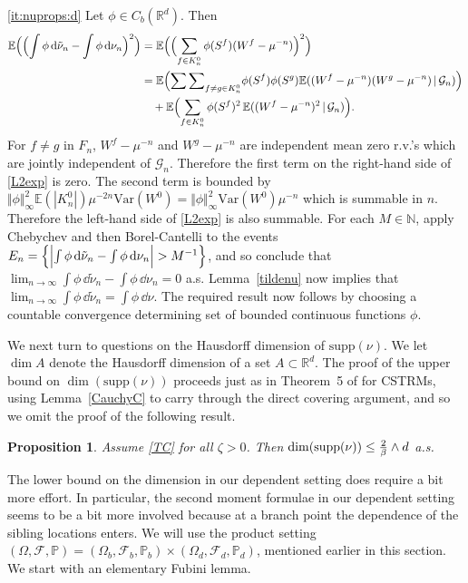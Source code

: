 \documentclass[12pt]{article}
\makeatletter
\renewenvironment{proof}[1][\proofname]{%
\par\pushQED{\qed}\normalfont%
\topsep6\p@\@plus6\p@\relax
\trivlist\item[\hskip\labelsep\bfseries#1\@addpunct{.}]%
\ignorespaces
}{%
\popQED\endtrivlist\@endpefalse
}
\newtheorem{proposition}[theorem]{Proposition}
\numberwithin{theorem}{section}
\theoremstyle{def}
\numberwithin{equation}{section}
\renewcommand{\P}{\mathbb{P}}
\newcommand{\E}{\mathbb{E}}
\newcommand{\R}{\mathbb{R}}
\newcommand{\N}{\mathbb{N}}
\newcommand{\cF}{\mathcal F}
\newcommand{\cG}{\mathcal G}
\newcommand{\supp}{\mathrm{supp}}
\makeatother
\begin{document}
\begin{proof}
\ref{it:nuprops:d} Let $\phi\in C_b(\R^d)$. Then
\begin{align}
\nonumber\E\Bigl(\Bigl( \int\phi\,\dd \tilde \nu_n-\int\phi\,\dd \nu_n\Bigr)^2\Bigr)&=\E\Bigl(\Bigl(\sum_{f\in K_n^0}\phi(S^f)(W^f-\mu^{-n})\Bigr)^2\Bigr)\\
\nonumber&=\E\Bigl({\sum\sum}_{f\neq g\in K^0_n} \phi(S^f)\phi(S^g)\E((W^f-\mu^{-n})(W^g-\mu^{-n}) \,| \,\cG_n)\Bigr)\\
\label{L2exp}&\quad+\E\Bigl(\sum_{f\in K^0_n}\phi(S^f)^2\,\E((W^f-\mu^{-n})^2 \, | \, \cG_n)\Bigr).
\end{align}
For $f\neq g$ in $F_n$, $W^f-\mu^{-n}$ and $W^g-\mu^{-n}$ are independent mean zero r.v.'s which are jointly independent of $\cG_n$. 
Therefore the first term on the right-hand side of \eqref{L2exp} is zero.  
The second term is bounded by $\Vert\phi\Vert_\infty^2\E(|K^0_n|)\mu^{-2n}\text{Var}(W^0)= \Vert\phi\Vert_\infty^2\text{Var}(W^0)\mu^{-n}$ which is summable in $n$.  
Therefore the left-hand side of \eqref{L2exp} is also summable. 
For each $M\in \N$, apply  Chebychev and then Borel-Cantelli to the events $E_n=\Bigl\{\Bigl| \int\phi\,\dd \tilde \nu_n-\int\phi\,\dd \nu_n\Bigr|>M^{-1}\Bigr\}$, and so conclude that $\lim_{n\to\infty}\int\phi\,\dd \tilde \nu_n-\int\phi\,\dd \nu_n=0$ a.s. Lemma~\ref{tildenu} now implies that  $\lim_{n\to\infty}\int\phi\,\dd \tilde \nu_n=\int\phi\,\dd \nu$. 
The required result
now follows by choosing a countable convergence determining set of bounded continuous functions $\phi$.
\end{proof} 

We next turn to questions on the Hausdorff dimension of $\supp(\nu)$.  We let $\dim A$ denote the Hausdorff dimension of a set $A\subset\R^d$. 
The proof of the upper bound on $\dim(\supp(\nu))$ proceeds just as in Theorem~5 of \cite{ADHP} for CSTRMs, using Lemma~\ref{CauchyC} to carry through the direct covering argument, and so we omit the proof of the following result.
\begin{proposition}\label{ubnd}
Assume \ref{TC} for all ${\zeta}>0$.  Then $\dim(\mathrm{supp}(\nu))\le {2\over \beta}\wedge d$ a.s.
\end{proposition}

The lower bound on the dimension in our dependent setting does require a bit more effort. In particular, the second moment formulae in our dependent setting seems to be a bit more involved because at a branch point the dependence of the sibling locations enters. We will use the product setting $(\Omega,\cF,\P)=(\Omega_b,\cF_b,\P_b)\times(\Omega_d,\cF_d,\P_d)$, mentioned earlier in this section.  We start with an elementary Fubini lemma. 
\end{document}
